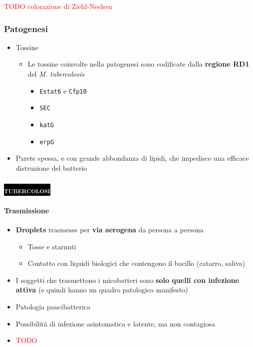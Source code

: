 \documentclass[italian,]{article}
\providecommand{\tightlist}{%
  \setlength{\itemsep}{0pt}\setlength{\parskip}{0pt}}
\newcommand{\pat}[1]{\colorbox{black}{\textcolor{white}{\textsc{#1}}}}
\newcommand{\TODO}[1]{\textcolor{red}{\textsf{\footnotesize{TODO #1}}}} %
\begin{document}
\TODO{colorazione di Ziehl-Neelsen}

\hypertarget{patogenesi-2}{%
\subsubsection{Patogenesi}\label{patogenesi-2}}

\begin{itemize}
\tightlist
\item
  Tossine

  \begin{itemize}
  \tightlist
  \item
    Le tossine coinvolte nella patogenesi sono codificate dalla
    \textbf{regione RD1} del \emph{M. tubercolosis}

    \begin{itemize}
    \tightlist
    \item
      \texttt{Estat6} e \texttt{Cfp10}
    \item
      \texttt{SEC}
    \item
      \texttt{katG}
    \item
      \texttt{erpG}
    \end{itemize}
  \end{itemize}
\item
  Parete spessa, e con grande abbondanza di lipidi, che impedisce una
  efficace distruzione del batterio
\end{itemize}

\hypertarget{section-9}{%
\subsubsection{\texorpdfstring{\pat{tubercolosi}}{}}\label{section-9}}

\hypertarget{trasmissione}{%
\paragraph{Trasmissione}\label{trasmissione}}

\begin{itemize}
\item
  \textbf{Droplets} trasmesse per \textbf{via aerogena} da persona a
  persona

  \begin{itemize}
  \tightlist
  \item
    Tosse e starnuti
  \item
    Contatto con liquidi biologici che contengono il bacillo (catarro,
    saliva)
  \end{itemize}
\item
  I soggetti che trasmettono i micobatteri sono \textbf{solo quelli con
  infezione attiva} (e quindi hanno un quadro patologico manifesto)
\item
  Patologia paucibatterica
\item
  Possibilità di infezione asintomatica e latente, ma non contagiosa
\item
  \TODO{}
\end{itemize}
\end{document}
